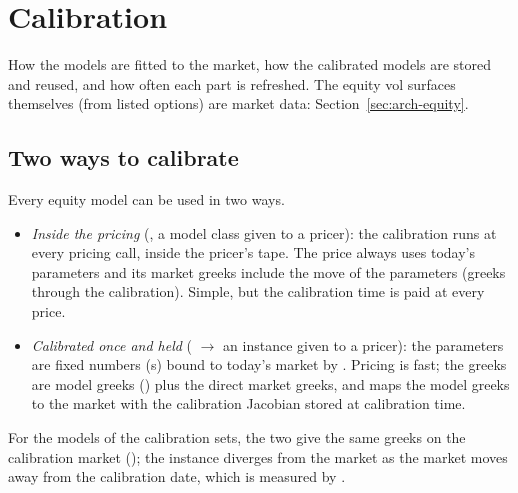 \section{Calibration}\label{sec:arch-calibration-chapter}
How the models are fitted to the market, how the calibrated models are stored and reused, and how often each part is
refreshed. The equity vol surfaces themselves (from listed options) are market data: Section~\ref{sec:arch-equity}.

\subsection{Two ways to calibrate}\label{sec:arch-calibration}
Every equity model can be used in two ways.
\begin{itemize}[nosep]
  \item \emph{Inside the pricing} (, a model class given to a
        pricer): the calibration runs at every pricing call, inside the pricer's tape. The price always uses today's
        parameters and its market greeks include the move of the parameters (greeks through the calibration). Simple,
        but the calibration time is paid at every price.
  \item \emph{Calibrated once and held} ( $\to$ an  instance given to a
        pricer): the parameters are fixed numbers (s) bound to today's market by
        . Pricing is fast; the greeks are model greeks () plus the
        direct market greeks, and  maps the model greeks to the market with the calibration Jacobian
        stored at calibration time.
\end{itemize}
For the models of the calibration sets, the two give the same greeks on the calibration market
(); the instance diverges from the market as the market moves away from the
calibration date, which is measured by .

